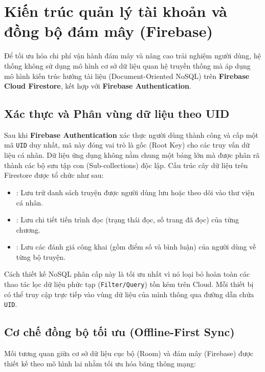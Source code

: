 \section{Kiến trúc quản lý tài khoản và đồng bộ đám mây (Firebase)}

Để tối ưu hóa chi phí vận hành đám mây và nâng cao trải nghiệm người dùng, hệ thống không sử dụng mô hình cơ sở dữ liệu quan hệ truyền thống mà áp dụng mô hình kiến trúc hướng tài liệu (Document-Oriented NoSQL) trên \textbf{Firebase Cloud Firestore}, kết hợp với \textbf{Firebase Authentication}.

\subsection{Xác thực và Phân vùng dữ liệu theo UID}
Sau khi \textbf{Firebase Authentication} xác thực người dùng thành công và cấp một mã \texttt{UID} duy nhất, mã này đóng vai trò là gốc (Root Key) cho các truy vấn dữ liệu cá nhân. Dữ liệu ứng dụng không nằm chung một bảng lớn mà được phân rã thành các bộ sưu tập con (Sub-collections) độc lập. Cấu trúc cây dữ liệu trên Firestore được tổ chức như sau:

\begin{itemize}
    \item {}: Lưu trữ danh sách truyện được người dùng lưu hoặc theo dõi vào thư viện cá nhân.
    \item {}: Lưu chi tiết tiến trình đọc (trạng thái đọc, số trang đã đọc) của từng chương.
    \item {}: Lưu các đánh giá công khai (gồm điểm số và bình luận) của người dùng về từng bộ truyện.
\end{itemize}

Cách thiết kế NoSQL phân cấp này là tối ưu nhất vì nó loại bỏ hoàn toàn các thao tác lọc dữ liệu phức tạp (\texttt{Filter/Query}) tốn kém trên Cloud. Mỗi thiết bị có thể truy cập trực tiếp vào vùng dữ liệu của mình thông qua đường dẫn chứa \texttt{UID}.

\subsection{Cơ chế đồng bộ tối ưu (Offline-First Sync)}
Mối tương quan giữa cơ sở dữ liệu cục bộ (Room) và đám mây (Firebase) được thiết kế theo mô hình lai nhằm tối ưu hóa băng thông mạng:

